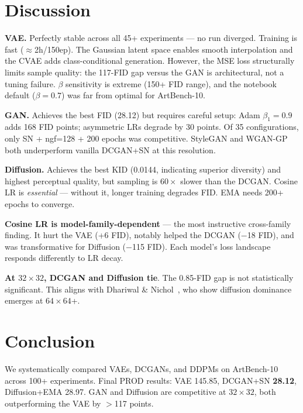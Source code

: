 \documentclass[runningheads]{llncs}
\begin{document}
\section{Discussion}\label{sec:discussion}

\textbf{VAE.} Perfectly stable across all 45+ experiments --- no run diverged. Training is fast ($\approx$2h/150ep). The Gaussian latent space enables smooth interpolation and the CVAE adds class-conditional generation. However, the MSE loss structurally limits sample quality: the 117-FID gap versus the GAN is architectural, not a tuning failure. $\beta$ sensitivity is extreme (150+ FID range), and the notebook default ($\beta=0.7$) was far from optimal for ArtBench-10.

\textbf{GAN.} Achieves the best FID (28.12) but requires careful setup: Adam $\beta_1=0.9$ adds 168 FID points; asymmetric LRs degrade by 30 points. Of 35 configurations, only SN + ngf=128 + 200 epochs was competitive. StyleGAN and WGAN-GP both underperform vanilla DCGAN+SN at this resolution.

\textbf{Diffusion.} Achieves the best KID (0.0144, indicating superior diversity) and highest perceptual quality, but sampling is $60\times$ slower than the DCGAN. Cosine LR is \emph{essential} --- without it, longer training degrades FID. EMA needs 200+ epochs to converge.

\textbf{Cosine LR is model-family-dependent} --- the most instructive cross-family finding. It hurt the VAE (+6 FID), notably helped the DCGAN ($-$18 FID), and was transformative for Diffusion ($-$115 FID). Each model's loss landscape responds differently to LR decay.

\textbf{At $32\times 32$, DCGAN and Diffusion tie}. The 0.85-FID gap is not statistically significant. This aligns with Dhariwal \& Nichol~\cite{dhariwal2021}, who show diffusion dominance emerges at $64\times 64$+.

\section{Conclusion}\label{sec:conclusion}

We systematically compared VAEs, DCGANs, and DDPMs on ArtBench-10 across 100+ experiments. Final PROD results: VAE 145.85, DCGAN+SN \textbf{28.12}, Diffusion+EMA 28.97. GAN and Diffusion are competitive at $32\times 32$, both outperforming the VAE by $>$117 points.
\end{document}

